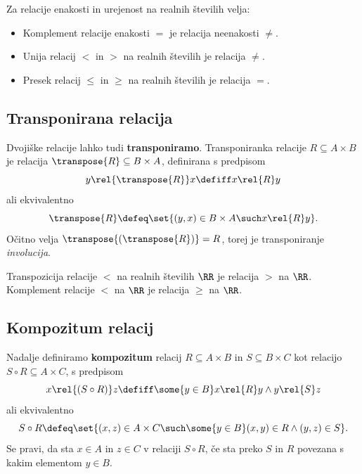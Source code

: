 \begin{zgled}
  Za relacije enakosti in urejenost na realnih številih velja:
  \begin{itemize}
  \item Komplement relacije enakosti $=$ je relacija neenakosti $\neq$.
  \item Unija relacij $<$ in $>$ na realnih številih je relacija $\neq$.
  \item Presek relacij $\leq$ in $\geq$ na realnih številih je relacija $=$.
  \end{itemize}
\end{zgled}


\subsection{Transponirana relacija}

Dvojiške relacije lahko tudi \textbf{transponiramo}. Transponiranka relacije $R \subseteq A \times B$ je relacija $\transpose{R} \subseteq B \times A$, definirana s predpisom
%
\begin{equation*}
    y \rel{\transpose{R}} x \defiff x \rel{R} y
\end{equation*}
%
ali ekvivalentno
%
\begin{equation*}
  \transpose{R} \defeq \set{ (y, x) \in B \times A \such x \rel{R} y }.
\end{equation*}
%
Očitno velja $\transpose{(\transpose{R})} = R$, torej je transponiranje \emph{involucija}.

\begin{zgled}
  Transpozicija relacije $<$ na realnih številih $\RR$ je relacija $>$ na $\RR$.
  Komplement relacije $<$ na $\RR$ je relacija $\geq$ na $\RR$.
\end{zgled}

\subsection{Kompozitum relacij}

Nadalje definiramo \textbf{kompozitum} relacij $R \subseteq A \times B$ in $S \subseteq B \times C$ kot relacijo $S \circ R \subseteq A \times C$, s predpisom
%
\begin{equation*}
    x \rel{(S \circ R)} z \defiff \some{y \in B} x \rel{R} y \land y \rel{S} z
\end{equation*}
ali ekvivalentno
%
\begin{equation*}
  S \circ R \defeq
  \set{ (x, z) \in A \times C \such \some{y \in B} (x,y) \in R \land (y,z) \in S }.
\end{equation*}
%
Se pravi, da sta $x \in A$ in $z \in C$ v relaciji $S \circ R$, če sta preko $S$ in $R$
povezana s kakim elementom $y \in B$.

